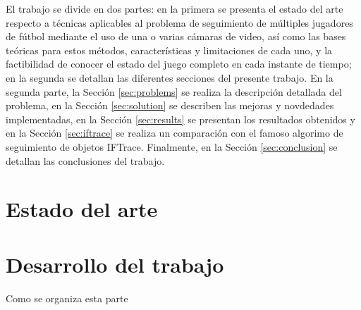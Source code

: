 \documentclass[a4paper,11pt]{article}
\begin{document}
El trabajo se divide en dos partes: en la primera se presenta el estado del arte respecto a
técnicas aplicables al problema de seguimiento de múltiples jugadores de fútbol
mediante el uso de una o varias cámaras de video, así como las bases teóricas
para estos métodos, características y limitaciones de cada uno, y la
factibilidad de conocer el estado del juego completo en cada instante de
tiempo; en la segunda se detallan las diferentes secciones
del presente trabajo. En la segunda parte, la Sección \ref{sec:problems} se realiza la descripción detallada del problema, en la Sección
\ref{sec:solution} se describen las mejoras y novdedades implementadas, en la Sección \ref{sec:results} se presentan los resultados obtenidos y en
la Sección \ref{sec:iftrace} se realiza un comparación con el famoso algorimo de seguimiento de objetos IFTrace. Finalmente, en la Sección
\ref{sec:conclusion} se detallan las conclusiones del trabajo.


\newpage

\part{Estado del arte}



\newpage

\part{Desarrollo del trabajo}

Como se organiza esta parte











\printbibliography
\end{document}
